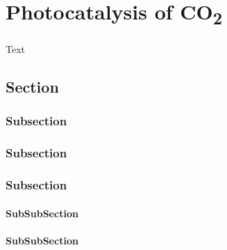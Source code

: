 \chapter{Photocatalysis of \texorpdfstring{CO\textsubscript{2}}{CO2}}
Text
\section{Section}
\subsection{Subsection}

\subsection{Subsection}

\subsection{Subsection}

\subsubsection{SubSubSection}

\subsubsection{SubSubSection}

